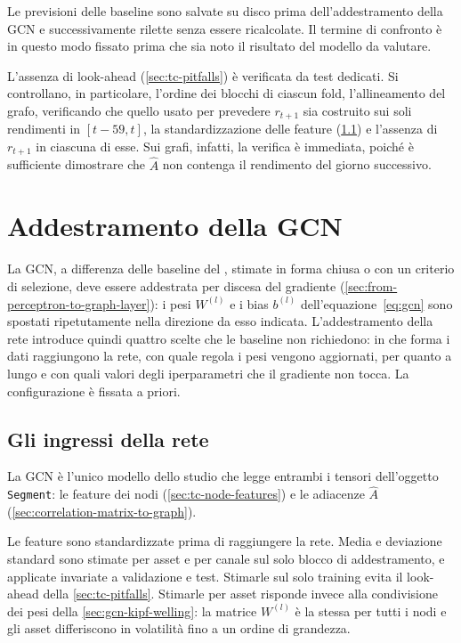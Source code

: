 Le previsioni delle baseline sono salvate su disco prima dell'addestramento della GCN e successivamente rilette senza essere ricalcolate. Il termine di confronto è in questo modo fissato prima che sia noto il risultato del modello da valutare.

L'assenza di look-ahead (\cref{sec:tc-pitfalls}) è verificata da test dedicati. Si controllano, in particolare, l'ordine dei blocchi di ciascun fold, l'allineamento del grafo, verificando che quello usato per prevedere $r_{t+1}$ sia costruito sui soli rendimenti in $[t-59,t]$, la standardizzazione delle feature (\cref{sec:tc-single-training}) e l'assenza di $r_{t+1}$ in ciascuna di esse. Sui grafi, infatti, la verifica è immediata, poiché è sufficiente dimostrare che $\hat A$ non contenga il rendimento del giorno successivo.

\section{Addestramento della GCN}
\label{sec:tc-gcn-training}

La GCN, a differenza delle baseline del , stimate in forma chiusa o con un criterio di selezione, deve essere addestrata per discesa del gradiente (\cref{sec:from-perceptron-to-graph-layer}): i pesi $W^{(l)}$ e i bias $b^{(l)}$ dell'equazione~\eqref{eq:gcn} sono spostati ripetutamente nella direzione da esso indicata. L'addestramento della rete introduce quindi quattro scelte che le baseline non richiedono: in che forma i dati raggiungono la rete, con quale regola i pesi vengono aggiornati, per quanto a lungo e con quali valori degli iperparametri che il gradiente non tocca. La configurazione è fissata a priori.

\subsection{Gli ingressi della rete}
\label{sec:tc-single-training}

La GCN è l'unico modello dello studio che legge entrambi i tensori dell'oggetto \texttt{Segment}: le feature dei nodi (\cref{sec:tc-node-features}) e le adiacenze $\hat A$ (\cref{sec:correlation-matrix-to-graph}).

Le feature sono standardizzate prima di raggiungere la rete. Media e deviazione standard sono stimate per asset e per canale sul solo blocco di addestramento, e applicate invariate a validazione e test. Stimarle sul solo training evita il look-ahead della \cref{sec:tc-pitfalls}. Stimarle per asset risponde invece alla condivisione dei pesi della \cref{sec:gcn-kipf-welling}: la matrice $W^{(l)}$ è la stessa per tutti i nodi e gli asset differiscono in volatilità fino a un ordine di grandezza.

